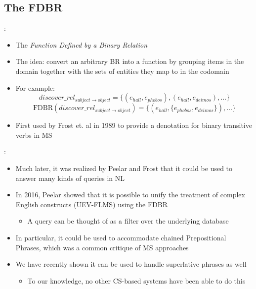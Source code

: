 \documentclass[logoontitle,tabu,supertabular,aspectratio=43]{preney-uwindsor-beamer}
\newcommand{\entityassoc}[1]{e_{#1}}
\newcommand{\FDBR}[1]{\mathrm{FDBR}({#1})}
\newcommand{\relationn}[3]{\mathit{#1\_rel_{#2 \rightarrow #3}}}
\begin{document}
    \subsection{The FDBR}
    \begin{frame}{\insertsection: \insertsubsection}
        \begin{itemize}
            \item The {\em Function Defined by a Binary Relation}
            \item The idea: convert an arbitrary BR into a function by grouping items in the domain together with the sets of entities they map to in the codomain
            \item For example:
            \begin{equation*}
                \relationn{discover}{subject}{object} = \{(\entityassoc{hall}, \entityassoc{phobos}),(\entityassoc{hall},\entityassoc{deimos}),\ldots\}
            \end{equation*}
            \begin{equation*}
                \FDBR{\relationn{discover}{subject}{object}} = \big\{(\entityassoc{hall}, \{\entityassoc{phobos}, \entityassoc{deimos}\}), \ldots\big\}
            \end{equation*}
            \item First used by Frost et. al in 1989 \cite{frost1989constructing} to provide a denotation for binary transitive verbs in MS
        \end{itemize}
    \end{frame}

    \begin{frame}{\insertsection: \insertsubsection}
        \begin{itemize}
            \item Much later, it was realized by Peelar and Frost that it could be used to answer many kinds of queries in NL
            \item In 2016, Peelar showed that it is possible to unify the treatment of complex English constructs (UEV-FLMS) using the FDBR \cite{peelar2016accommodating}
            \begin{itemize}
                \item A query can be thought of as a filter over the underlying database
            \end{itemize}
            \item In particular, it could be used to accommodate chained Prepositional Phrases, which was a common critique of MS approaches
            \item We have recently shown it can be used to handle superlative phrases as well
            \begin{itemize}
                \item To our knowledge, no other CS-based systems have been able to do this
            \end{itemize}
        \end{itemize}
    \end{frame}
\end{document}
